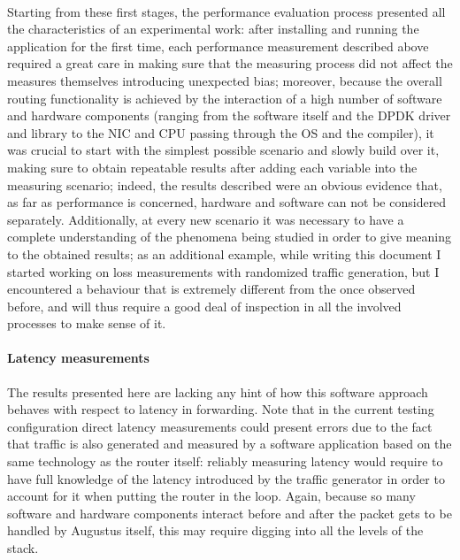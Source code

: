 \documentclass[11pt,a4paper,twoside,titlepage,openany]{book}
\begin{document}
\paragraph{} Starting from these first stages, the performance evaluation process presented all the characteristics of an experimental work: after installing and running the application for the first time, each performance measurement described above required a great care in making sure that the measuring process did not affect the measures themselves introducing unexpected bias; moreover, because the overall routing functionality is achieved by the interaction of a high number of software and hardware components (ranging from the software itself and the DPDK driver and library  to the NIC and CPU passing through the OS and the compiler), it was crucial to start with the simplest possible scenario and slowly build over it, making sure to obtain repeatable results after adding each variable into the measuring scenario; indeed, the results described were an obvious evidence that, as far as performance is concerned, hardware and software can not be considered separately.
Additionally, at every new scenario it was necessary to have a complete understanding of the phenomena being studied in order to give meaning to the obtained results; as an additional example, while writing this document I started working on loss measurements with randomized traffic generation, but I encountered a behaviour that is extremely different from the once observed before, and will thus require a good deal of inspection in all the involved processes to make sense of it.

\paragraph{Latency measurements} The results presented here are lacking any hint of how this software approach behaves with respect to latency in forwarding. Note that in the current testing configuration direct latency measurements could present errors due to the fact that traffic is also generated and measured by a software application based on the same technology as the router itself: reliably measuring latency would require to have full knowledge of the latency introduced by the traffic generator in order to account for it when putting the router in the loop. Again, because so many software and hardware components interact before and after the packet gets to be handled by Augustus itself, this may require digging into all the levels of the stack.
\end{document}
